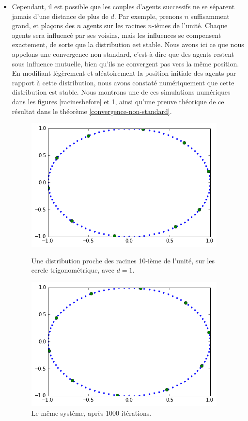 \documentclass[a4paper,10pt]{article}
\begin{document}
\begin{itemize}
\item Cependant, il est possible que les couples d'agents successifs ne se séparent jamais d'une distance de plus de $d$. Par exemple, prenons $n$ suffisamment grand, et plaçons des $n$ agents sur les racines $n$-ièmes de l'unité. Chaque agents sera influencé par ses voisins, mais les influences se compensent exactement, de sorte que la distribution est stable. Nous avons ici ce que nous appelons une convergence non standard, c'est-à-dire que des agents restent sous influence mutuelle, bien qu'ils ne convergent pas vers la même position. 
En modifiant légèrement et aléatoirement la position initiale des agents par rapport à cette distribution, nous avons constaté numériquement que cette distribution est stable. Nous montrons une de ces simulations numériques dans les figures \ref{racinesbefore} et \ref{racines1000}, ainsi qu'une preuve théorique de ce résultat dans le théorème \ref{convergence-non-standard}. 

\begin{figure}
\center
\includegraphics[scale=0.5]{racinesbefore.png}
\caption{Une distribution proche des racines 10-ième de l'unité, sur les cercle trigonométrique, avec $d=1$.}
\label{racinesbefore}
\center
\includegraphics[scale=0.5]{racines1000.png}
\caption{Le même système, après 1000 itérations.}
\label{racines1000}
\end{figure}

\end{itemize}
\end{document}
